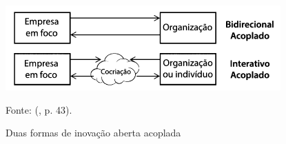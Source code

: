 \begin{figure}[H]
    \caption{Duas formas de inovação aberta acoplada}
    \centering
    \includegraphics[width=\linewidth]{images/fundamentacao/cocriacao.png}
    \label{fig:cocriacao}
    
    Fonte: \citeauthor{chesbrough2014} (\citeyear{chesbrough2014}, p. 43).
\end{figure}